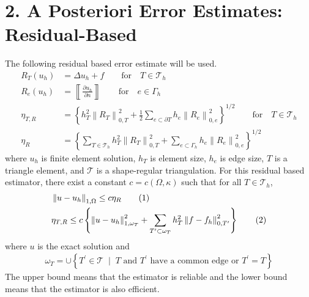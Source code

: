 \documentclass[11pt, letterpaper, hidelinks]{article}
\theoremstyle{definition}
\newcommand\numberthis{\addtocounter{equation}{1}\tag{\theequation}}
\newcommand{\norm}[1]{\left\lVert#1\right\rVert}
\begin{document}
\section{2. A Posteriori Error Estimates: Residual-Based}
The following residual based error estimate will be used.
\begin{align*}
    R_T(u_h)   & = \Delta u_h + f \qquad \text{for} \quad T \in \mathcal{T}_h                                                                                                 \\
    R_e(u_h)   & = \left\llbracket \frac{\partial u_h}{\partial n} \right\rrbracket   \qquad \text{for} \quad e \in \Gamma_h                                                  \\
    \eta_{T,R} & = \left\{ h_T^2 \norm{R_T}_{0,T}^2 + \frac{1}{2} \sum_{e\subset \partial T} h_e \norm{R_e}_{0,e}^2 \right\}^{1/2} \qquad\text{for} \quad T \in \mathcal{T}_h \\
    \eta_R     & = \left\{ \sum_{T\in \mathcal{T}_h} h^2_T \norm{R_T}_{0,T}^2 + \sum_{e\subset \Gamma_h} h_e \norm{R_e}_{0,e}^2  \right\}^{1/2}
\end{align*}
where $u_h$ is finite element solution, $h_T$ is element size, $h_e$ is edge size, $T$ is a triangle element, and $\mathcal{T}$ is a shape-regular triangulation. For this residual based estimator, there exist a constant $c=c(\Omega, \kappa)$ such that for all $ T \in \mathcal{T}_h $,
\begin{align*}
     & \norm{u-u_h}_{1,\Omega} \le c\eta_R  \numberthis \label{reliability}                                                                                                 \\
     & \eta_{T,R}\le c \left\{ \norm{u-u_h}_{1,\omega_T}^2 + \sum_{T^{\prime} \subset \omega_T} h^2_T \norm{f-f_h}_{0,T^{\prime}}^2 \right\} \numberthis \label{efficiency}
\end{align*}
where $u$ is the exact solution and
\begin{align*}
    \omega_T = \cup \left\{ T^{\prime} \in \mathcal{T} \;\; | \;\; T \text{ and } T^{\prime} \text{ have a common edge or } T^{\prime}=T \right\}
\end{align*}
The upper bound means that the estimator is reliable and the lower bound means that the estimator is also efficient.
\end{document}
